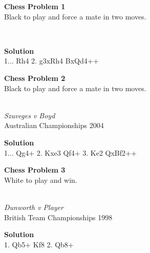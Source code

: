 \documentclass{article}
\begin{document}
\medskip
\newgame
 
\begin{center} 

\large\textbf{Chess Problem 1}\\
Black to play and force a mate in two moves.
\vspace{0.25cm}

\showboard
\\
\vspace{0.25cm}

\textbf{Solution} \\
1... Rh4 2. g3xRh4 BxQd4++
 
\vspace{0.25cm}


\end{center}


\newgame
 
\begin{center} 

\large\textbf{Chess Problem 2}\\
Black to play and force a mate in two moves.
\vspace{0.25cm}

\showboard
\\\textit{Szuveges v Boyd}\\
Australian Championships 2004
\vspace{0.25cm}

\textbf{Solution} \\
1... Qg4+ 2. Kxe3 Qf4+ 3. Ke2 QxBf2++

 
\vspace{0.25cm}

\end{center}
\clearpage

\newgame
 
\begin{center} 

\large\textbf{Chess Problem 3} \\
White to play and win.
\vspace{0.25cm}

\showboard
\\\textit{Dunworth v Player}\\
British Team Championships 1998

\vspace{0.25cm}

\textbf{Solution} \\
1. Qb5+ Kf8 2. Qb8+ 

 
\vspace{0.25cm}




\end{center}

\clearpage
\end{document}
